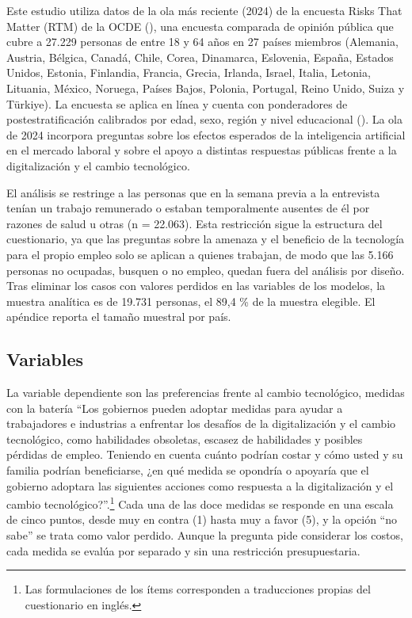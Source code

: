 \documentclass[
  spanish,
  12pt,
]{article}
\begin{document}
Este estudio utiliza datos de la ola más reciente (2024) de la encuesta
Risks That Matter (RTM) de la OCDE (), una encuesta comparada de opinión pública que cubre a 27.229
personas de entre 18 y 64 años en 27 países miembros (Alemania, Austria,
Bélgica, Canadá, Chile, Corea, Dinamarca, Eslovenia, España, Estados
Unidos, Estonia, Finlandia, Francia, Grecia, Irlanda, Israel, Italia,
Letonia, Lituania, México, Noruega, Países Bajos, Polonia, Portugal,
Reino Unido, Suiza y Türkiye). La encuesta se aplica en línea y cuenta
con ponderadores de postestratificación calibrados por edad, sexo,
región y nivel educacional (). La ola de 2024 incorpora preguntas sobre los efectos
esperados de la inteligencia artificial en el mercado laboral y sobre el
apoyo a distintas respuestas públicas frente a la digitalización y el
cambio tecnológico.

El análisis se restringe a las personas que en la semana previa a la
entrevista tenían un trabajo remunerado o estaban temporalmente ausentes
de él por razones de salud u otras (n = 22.063). Esta restricción sigue
la estructura del cuestionario, ya que las preguntas sobre la amenaza y
el beneficio de la tecnología para el propio empleo solo se aplican a
quienes trabajan, de modo que las 5.166 personas no ocupadas, busquen o
no empleo, quedan fuera del análisis por diseño. Tras eliminar los casos
con valores perdidos en las variables de los modelos, la muestra
analítica es de 19.731 personas, el 89,4 \% de la muestra elegible. El
apéndice reporta el tamaño muestral por país.

\subsection{Variables}\label{variables}

La variable dependiente son las preferencias frente al cambio
tecnológico, medidas con la batería ``Los gobiernos pueden adoptar
medidas para ayudar a trabajadores e industrias a enfrentar los desafíos
de la digitalización y el cambio tecnológico, como habilidades
obsoletas, escasez de habilidades y posibles pérdidas de empleo.
Teniendo en cuenta cuánto podrían costar y cómo usted y su familia
podrían beneficiarse, ¿en qué medida se opondría o apoyaría que el
gobierno adoptara las siguientes acciones como respuesta a la
digitalización y el cambio tecnológico?''.\footnote{Las formulaciones de
  los ítems corresponden a traducciones propias del cuestionario en
  inglés.} Cada una de las doce medidas se responde en una escala de
cinco puntos, desde muy en contra (1) hasta muy a favor (5), y la opción
``no sabe'' se trata como valor perdido. Aunque la pregunta pide
considerar los costos, cada medida se evalúa por separado y sin una
restricción presupuestaria.
\end{document}
